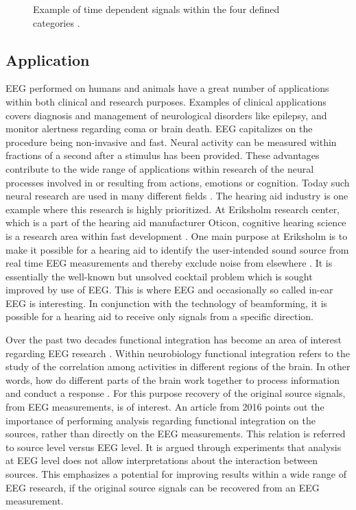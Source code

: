 \begin{figure}[H]
\begin{minipage}[t]{.45\textwidth}
        \caption{Example of time dependent signals within the four defined categories \cite{EEGsignalprocessing}.}\label{fig:EEG_example}
    \end{minipage}
\end{figure}
\noindent

\subsection{Application}\label{seg:application}
EEG performed on humans and animals have a great number of applications within both clinical and research purposes. 
Examples of clinical applications covers diagnosis and management of neurological disorders like epilepsy, and monitor alertness regarding coma or brain death.
EEG capitalizes on the procedure being non-invasive and fast.
Neural activity can be measured within fractions of a second after a stimulus has been provided. 
These advantages contribute to the wide range of applications within research of the neural processes involved in or resulting from actions, emotions or cognition. Today such neural research are used in many different fields \cite[p. 4]{fundamentalEEG}.
The hearing aid industry is one example where this research is highly prioritized. 
At Eriksholm research center, which is a part of the hearing aid manufacturer Oticon, cognitive hearing science is a research area within fast development \cite{Weberik}. 
One main purpose at Eriksholm is to make it possible for a hearing aid to identify the user-intended sound source from real time EEG measurements and thereby exclude noise from elsewhere \cite{Emina2019}\cite{Bech2018}. 
It is essentially the well-known but unsolved cocktail problem which is sought improved by use of EEG. 
This is where EEG and occasionally so called in-ear EEG is interesting. In conjunction with the technology of beamforming, it is possible for a hearing aid to receive only signals from a specific direction. 

Over the past two decades functional integration has become an area of interest regarding EEG research \cite{Friston2011}. 
Within neurobiology functional integration refers to the study of the correlation among activities in different regions of the brain. 
In other words, how do different parts of the brain work together to process information and conduct a response \cite{Friston2002}. 
For this purpose recovery of the original source signals, from EEG measurements, is of interest. 
An article from 2016 \cite{Van2019} points out the importance of performing analysis regarding functional integration on the sources, rather than directly on the EEG measurements. This relation is referred to source level versus EEG level. 
It is argued through experiments that analysis at EEG level does not allow interpretations about the interaction between sources. 
This emphasizes a potential for improving results within a wide range of EEG research, if the original source signals can be recovered from an EEG measurement.    

